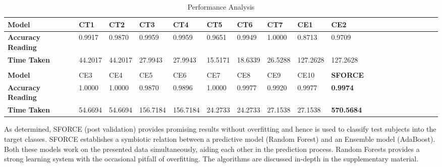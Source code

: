 \documentclass[final,1p,times,twocolumn]{elsarticle}
\begin{document}
\begin{table}[!t]
\scriptsize
\caption{Performance Analysis}
\label{table:t1}
\centering
\scalebox{0.95}
{
\begin{tabular}{| l | l | l | l | l | l | l | l | l | l | l | l | l | l | l | l | l | l | l | l |}
\hline
\textbf{Model} & {CT1} & {CT2} & {CT3} & {CT4} & {CT5} & {CT6} & {CT7} & {CE1} & {CE2}\\
\hline
\textbf{Accuracy Reading}& 0.9917 & 0.9870 & 0.9959 & 0.9959 & 0.9651 & 0.9949 & 1.0000 & 0.8713 & 0.9709\\
\hline
\textbf{Time Taken}& 44.2017 & 44.2017 & 27.9943 & 27.9943 & 15.5171 & 18.6339 & 26.5288 & 127.2628 & 127.2628\\
\hline
&&&&&&&&&\\
\hline
\textbf{Model} & {CE3} & {CE4} & {CE5} & {CE6} & {CE7} & {CE8} & {CE9} & {CE10} & \textbf{SFORCE} \\
\hline
\textbf{Accuracy Reading}& 1.0000 & 1.0000 & 0.9870 & 0.9896 & 1.0000 & 0.9977 & 0.9920 & 0.9977 & \textbf{0.9974} \\
\hline
\textbf{Time Taken}& 54.6694 & 54.6694 & 156.7184 & 156.7184 & 24.2733 & 24.2733 & 27.1538 & 27.1538 & \textbf{570.5684} \\
\hline
\end{tabular}
}
\end{table}
% 

As determined, SFORCE (post validation) provides promising results without overfitting and hence is used to classify test subjects into the target classes. SFORCE establishes a symbiotic relation between a predictive model (Random Forest) and an Ensemble model (AdaBoost). Both these models work on the presented data simultaneously, aiding each other in the prediction process. Random Forests provides a strong learning system with the occasional pitfall of overfitting. The algorithms are discussed in-depth in the supplementary material. 
\end{document}
